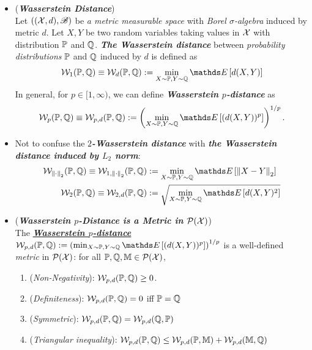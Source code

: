 \documentclass[11pt]{article}
\begin{document}
\begin{itemize}
\item \begin{definition} (\textbf{\emph{Wasserstein Distance}}) \\
Let $(({\mathcal X}, d), {\mathscr B})$ be \emph{a metric measurable space} with \emph{Borel $\sigma$-algebra} induced by metric $d$. Let $X, Y$ be two random variables taking values in ${\mathcal X}$ with distribution ${\mathbb P}$ and ${\mathbb Q}$. \emph{\textbf{The Wasserstein distance}} between \emph{probability distributions} ${\mathbb P}$ and ${\mathbb Q}$ induced by $d$ is defined as
\begin{align}
\cW_1(\bP, \bQ)  \equiv  \cW_d(\bP, \bQ) := \min_{X \sim \bP, Y \sim \bQ} \E{}{d(X, Y)} \label{def: wasserstein_dist}
\end{align} In general, for $p \in [1, \infty)$, we can define \emph{\textbf{Wasserstein $p$-distance}} as
\begin{align}
\cW_p(\bP, \bQ)  \equiv \cW_{p,d}(\bP, \bQ)  := \paren{\min_{X \sim \bP, Y \sim \bQ} \E{}{(d(X, Y))^p}}^{1/p}. \label{def: wasserstein_dist_p_norm}
\end{align}
\end{definition}

\item \begin{remark}
Not to confuse the \emph{\textbf{$2$-Wasserstein distance}} with \emph{\textbf{the Wasserstein distance induced by $L_2$ norm}}:
\begin{align*}
\cW_{\norm{\cdot}{2}}(\bP, \bQ) \equiv  \cW_{1, \norm{\cdot}{2}}(\bP, \bQ)  &:= \min_{X \sim \bP, Y \sim \bQ} \E{}{\norm{X - Y}{2}} \\
\cW_{2}(\bP, \bQ)   \equiv  \cW_{2, d}(\bP, \bQ)  &:= \sqrt{\min_{X \sim \bP, Y \sim \bQ} \E{}{d(X, Y)^2}} 
\end{align*} 
\end{remark}

\item \begin{remark} (\emph{\textbf{Wasserstein $p$-Distance is a Metric in ${\mathcal P}({\mathcal X})$}}) \\
The \underline{\textbf{\emph{Wasserstein $p$-distance}}} $\cW_{p,d}(\bP, \bQ)  := \paren{\min_{X \sim \bP, Y \sim \bQ} \E{}{(d(X, Y))^p}}^{1/p}$ is a well-defined \emph{metric} in ${\mathcal P}({\mathcal X})$: for all ${\mathbb P}, {\mathbb Q}, {\mathbb M} \in {\mathcal P}({\mathcal X})$, 
\begin{enumerate}
\item (\emph{Non-Negativity}):\; ${\mathcal W}_{p,d}({\mathbb P}, {\mathbb Q}) \ge 0$.
\item (\emph{Definiteness}):\; ${\mathcal W}_{p,d}({\mathbb P}, {\mathbb Q}) = 0 $ iff ${\mathbb P} = {\mathbb Q}$
\item (\emph{Symmetric}):\; ${\mathcal W}_{p,d}({\mathbb P}, {\mathbb Q}) = {\mathcal W}_{p,d}({\mathbb Q}, {\mathbb P})$
\item (\emph{Triangular inequality}): \; ${\mathcal W}_{p,d}({\mathbb P}, {\mathbb Q})  \le {\mathcal W}_{p,d}({\mathbb P}, {\mathbb M} )  + {\mathcal W}_{p,d}({\mathbb M} , {\mathbb Q}) $
\end{enumerate}
\end{remark}


\end{itemize}
\end{document}
